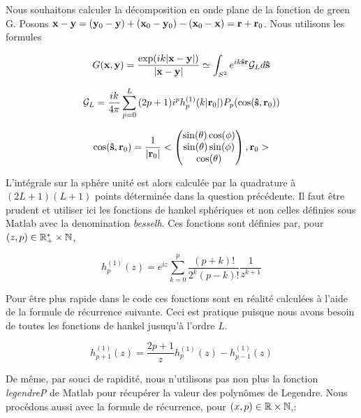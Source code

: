 \documentclass[10pt]{article}
\begin{document}
\begin{multicols}{2}
Nous souhaitons calculer la décomposition en onde plane de la fonction de green G. Posons ${\bf x} - {\bf y} = ({\bf y}_0 - {\bf y}) + ({\bf x}_0 - {\bf y}_0) - ({\bf x}_0 - {\bf x}) = {\bf r} + {\bf r}_0$. Nous utilisons les formules 

\begin{equation}
	G({\bf x}, {\bf y}) = \frac{\exp(ik|{\bf x}-{\bf y}|)}{|{\bf x}-{\bf y}|} \simeq \int_{S^{2}}{e^{ik{\bf \hat{s}}{\bf r}}\mathcal{G}_Ld{\bf \hat{s}}}
\end{equation}

\vspace*{-11pt}

\begin{equation}
\mathcal{G}_L = \frac{ik}{4\pi}\sum_{p=0}^{L}{(2p+1)i^{p}h_p^{(1)}(k|{\bf r}_0|)P_p(\cos({\bf \hat{s}}, {\bf r}_0))}
\end{equation}

\vspace*{-11pt}

\begin{equation}
\cos({\bf \hat{s}}, {\bf r}_0) = \frac{1}{|{\bf r}_0|}< \begin{pmatrix} \sin(\theta)\cos(\phi)  \\ \sin(\theta)\sin(\phi)  \\ \cos(\theta) \end{pmatrix} , {\bf r}_0 >
\end{equation}


L'intégrale sur la sphére unité est alors calculée par la quadrature à $(2L+1)(L+1)$ points déterminée dans la question précédente. Il faut être prudent et utiliser ici les fonctions de hankel sphériques et non celles définies sous Matlab avec la denomination \textit{besselh}. Ces fonctions sont définies par, pour $(z,p) \in \mathbb{R}^{*}_{+}\times\mathbb{N}$,

\begin{equation}
	h^{(1)}_{p}(z) = e^{iz}\sum_{k=0}^{p}{\frac{(p+k)!}{2^{k}(p-k)!}\frac{1}{z^{k+1}}}
\end{equation}

Pour être plus rapide dans le code ces fonctions sont en réalité calculées à l'aide de la formule de récurrence suivante. Ceci est pratique puisque nous avons besoin de toutes les fonctions de hankel jusuqu'à l'ordre $L$.

\begin{equation}
	h_{p+1}^{(1)}(z) =  \frac{2p+1}{z}h_{p}^{(1)}(z) - h_{p-1}^{(1)}(z) 
\end{equation}

De même, par souci de rapidité, nous n'utilisons pas non plus la fonction \textit{legendreP} de Matlab pour récupérer la valeur des polynômes de Legendre. Nous procédons aussi avec la formule de récurrence, pour  $(x,p) \in \mathbb{R}\times\mathbb{N}$,: 


\end{multicols}
\end{document}
